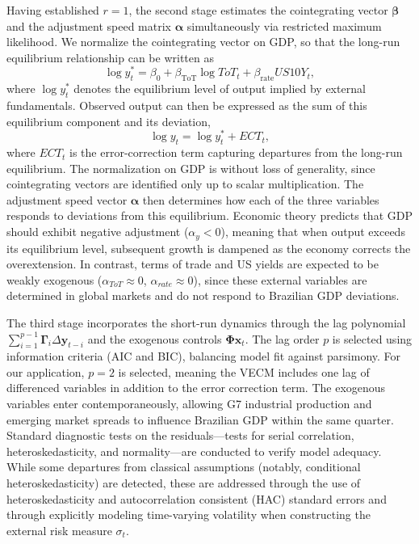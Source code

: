 \documentclass[12pt,a4paper]{article}
\numberwithin{equation}{section}
\theoremstyle{definition}
\theoremstyle{remark}
\newcommand{\vect}[1]{\boldsymbol{#1}}
\begin{document}
Having established $r=1$, the second stage estimates the cointegrating vector $\vect{\beta}$ and the adjustment speed matrix $\vect{\alpha}$ simultaneously via restricted maximum likelihood. We normalize the cointegrating vector on GDP, so that the long-run equilibrium relationship can be written as
\[
\log y_t^{*} = \beta_0 + \beta_{\text{ToT}} \log ToT_t + \beta_{\text{rate}} US10Y_t,
\]
where $\log y_t^{*}$ denotes the equilibrium level of output implied by external fundamentals. 
Observed output can then be expressed as the sum of this equilibrium component and its deviation,
\[
\log y_t = \log y_t^{*} + ECT_t,
\]
where $ECT_t$ is the error-correction term capturing departures from the long-run equilibrium. 
The normalization on GDP is without loss of generality, since cointegrating vectors are identified only up to scalar multiplication. The adjustment speed vector $\vect{\alpha}$ then determines how each of the three variables responds to deviations from this equilibrium. Economic theory predicts that GDP should exhibit negative adjustment ($\alpha_y < 0$), meaning that when output exceeds its equilibrium level, subsequent growth is dampened as the economy corrects the overextension. In contrast, terms of trade and US yields are expected to be weakly exogenous ($\alpha_{ToT} \approx 0$, $\alpha_{rate} \approx 0$), since these external variables are determined in global markets and do not respond to Brazilian GDP deviations.

The third stage incorporates the short-run dynamics through the lag polynomial $\sum_{i=1}^{p-1} \vect{\Gamma}_i \Delta \vect{y}_{t-i}$ and the exogenous controls $\vect{\Phi} \vect{x}_t$. The lag order $p$ is selected using information criteria (AIC and BIC), balancing model fit against parsimony. For our application, $p=2$ is selected, meaning the VECM includes one lag of differenced variables in addition to the error correction term. The exogenous variables enter contemporaneously, allowing G7 industrial production and emerging market spreads to influence Brazilian GDP within the same quarter. Standard diagnostic tests on the residuals---tests for serial correlation, heteroskedasticity, and normality---are conducted to verify model adequacy. While some departures from classical assumptions (notably, conditional heteroskedasticity) are detected, these are addressed through the use of heteroskedasticity and autocorrelation consistent (HAC) standard errors and through explicitly modeling time-varying volatility when constructing the external risk measure $\sigma_t$.
\end{document}
